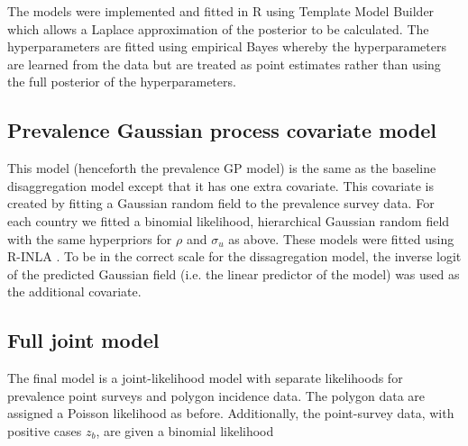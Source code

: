 \documentclass[10pt,letterpaper]{article}
\begin{document}
The models were implemented and fitted in R \cite{R} using Template Model Builder \cite{TMB} which allows a Laplace approximation of the posterior to be calculated.
The hyperparameters are fitted using empirical Bayes whereby the hyperparameters are learned from the data but are treated as point estimates rather than using the full posterior of the hyperparameters.

%
%
%
%
%
%
%

\subsection*{Prevalence Gaussian process covariate model}

This model (henceforth the prevalence GP model) is the same as the baseline disaggregation model except that it has one extra covariate.
This covariate is created by fitting a Gaussian random field to the prevalence survey data.
For each country we fitted a binomial likelihood, hierarchical Gaussian random field with the same hyperpriors for $\rho$ and $\sigma_u$ as above.
These models were fitted using R-INLA \cite{INLA}.
To be in the correct scale for the dissagregation model, the inverse logit of the predicted Gaussian field (i.e. the linear predictor of the model) was used as the additional covariate.

\subsection*{Full joint model}

The final model is a joint-likelihood model with separate likelihoods for prevalence point surveys and polygon incidence data.
The polygon data are assigned a Poisson likelihood as before.
Additionally, the point-survey data, with positive cases $z_b$, are given a binomial likelihood
\end{document}
